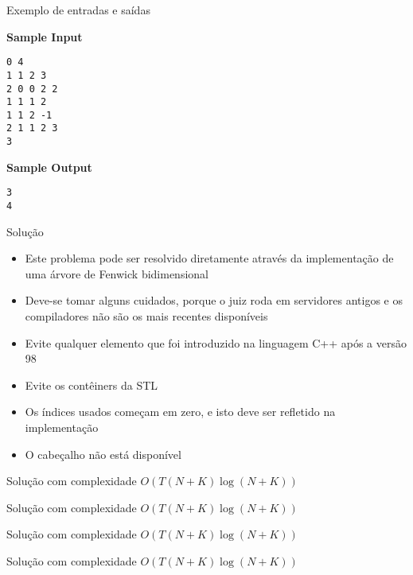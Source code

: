 \begin{frame}[fragile]{Exemplo de entradas e saídas}

\begin{minipage}[t]{0.6\textwidth}
\textbf{Sample Input}
\begin{verbatim}
0 4
1 1 2 3
2 0 0 2 2 
1 1 1 2
1 1 2 -1
2 1 1 2 3 
3
\end{verbatim}
\end{minipage}
\begin{minipage}[t]{0.35\textwidth}
\textbf{Sample Output}
\begin{verbatim}
3
4
\end{verbatim}
\end{minipage}

\end{frame}

\begin{frame}[fragile]{Solução}

    \begin{itemize}
        \item Este problema pode ser resolvido diretamente através da implementação de uma
            árvore de Fenwick bidimensional

        \item Deve-se tomar alguns cuidados, porque o juiz roda em servidores antigos e
            os compiladores não são os mais recentes disponíveis

        \item Evite qualquer elemento que foi introduzido na linguagem C++ após a versão 98

        \item Evite os contêiners da STL

        \item Os índices usados começam em zero, e isto deve ser refletido na implementação
        
        \item O cabeçalho  não está disponível

   \end{itemize}

\end{frame}

\begin{frame}[fragile]{Solução com complexidade $O(T(N + K)\log(N + K))$}
\end{frame}

\begin{frame}[fragile]{Solução com complexidade $O(T(N + K)\log(N + K))$}
\end{frame}

\begin{frame}[fragile]{Solução com complexidade $O(T(N + K)\log(N + K))$}
\end{frame}

\begin{frame}[fragile]{Solução com complexidade $O(T(N + K)\log(N + K))$}
\end{frame}
